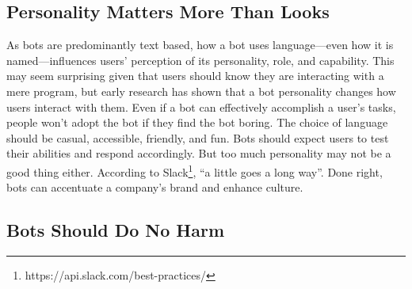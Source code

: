 \documentclass{sig-alternate}
\begin{document}
	\subsection{Personality Matters More Than Looks} 
	As bots are predominantly text based, how a bot uses language---even how it is named---influences users' perception of its personality, role, and capability.  This may seem surprising given that users should know they are interacting with a mere program, but early research has shown that a bot personality changes how users interact with them. 
	Even if a bot can effectively accomplish a user's tasks, people won't adopt the bot if they find the bot boring. The choice of language should be casual, accessible, friendly, and fun.  Bots should expect users to test their abilities and respond accordingly.
	But too much personality may not be a good thing either.  According to Slack\footnote{https://api.slack.com/best-practices/}, ``a little goes a long way''.  Done right, bots can accentuate a company's brand and enhance culture.

\subsection{Bots Should Do No Harm}

\end{document}
